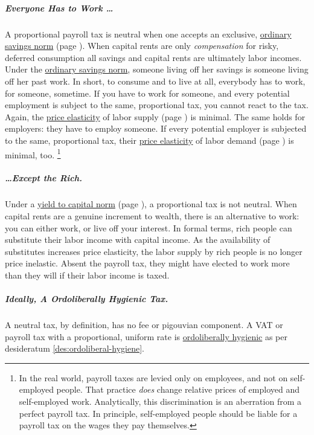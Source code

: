 \subparagraph{Everyone Has to Work \ldots}
A proportional payroll tax is neutral when one accepts an exclusive, \hyperref[sec:OSN]{ordinary savings norm} (page \pageref{sec:OSN}).
When capital rents are only \emph{compensation} for risky, deferred consumption all savings and capital rents are ultimately labor incomes.
Under the \hyperref[sec:OSN]{ordinary savings norm}, someone living off her savings is someone living off her past work.
In short, to consume and to live at all, everybody has to work, for someone, sometime.
If you have to work for someone, and every potential employment is subject to the same, proportional tax, you cannot react to the tax.
Again, the \hyperref[eq:PES]{price elasticity} of labor supply (page \pageref{eq:PES}) is minimal.
The same holds for employers:
they have to employ someone.
If every potential employer is subjected to the same, proportional tax, their \hyperref[eq:PES]{price elasticity} of labor demand (page \pageref{eq:PES}) is minimal, too.
\footnote{
	In the real world, payroll taxes are levied only on employees, and not on self-employed people.
	That practice \emph{does} change relative prices of employed and self-employed work.
	Analytically, this discrimination is an aberration from a perfect payroll tax.
	In principle, self-employed people should be liable for a payroll tax on the wages they pay themselves.
}

\subparagraph{\ldots Except the Rich.}
Under a \hyperref[sec:Y2C]{yield to capital norm} (page \pageref{sec:Y2C}), a proportional tax is not neutral.
When capital rents are a genuine increment to wealth, there is an alternative to work:
you can either work, or live off your interest.
In formal terms, rich people can substitute their labor income with capital income.
As the availability of substitutes increases price elasticity, the labor supply by rich people is no longer price inelastic.
Absent the payroll tax, they might have elected to work more than they will if their labor income is taxed.

\subparagraph{Ideally, A Ordoliberally Hygienic Tax.}
A neutral tax, by definition, has no fee or pigouvian component.
A VAT or payroll tax with a proportional, uniform rate is \hyperref[des:ordoliberal-hygiene]{ordoliberally hygienic} as per desideratum \ref{des:ordoliberal-hygiene}.

